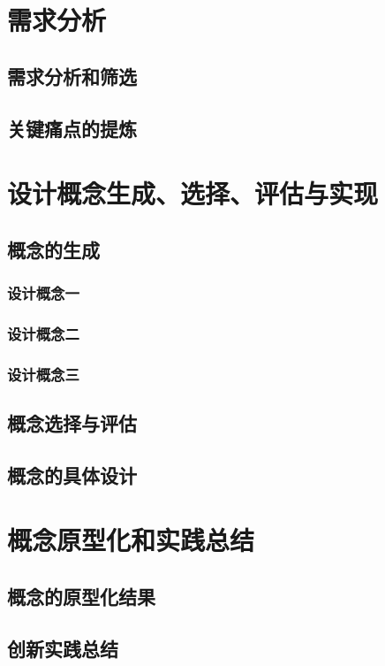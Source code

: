 \documentclass[a4paper]{ctexart}
\numberwithin{equation}{section}
\numberwithin{table}{section}
\numberwithin{figure}{section}
\begin{document}
\section{需求分析}

\subsection{需求分析和筛选}

\subsection{关键痛点的提炼}

\section{设计概念生成、选择、评估与实现}


\subsection{概念的生成}

\subsubsection{设计概念一}
\subsubsection{设计概念二}
\subsubsection{设计概念三}

\subsection{概念选择与评估}
\subsection{概念的具体设计}


\section{概念原型化和实践总结}
\subsection{概念的原型化结果}



\subsection{创新实践总结}

\newpage
\thispagestyle{fancy}
\lhead{}
\chead{\it\small{\textcolor{grey}{参考文献}}}
\rhead{}
{}


\end{document}
